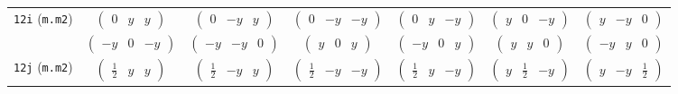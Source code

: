 \documentclass[fleqn,9pt,landscape]{jsarticle}
\begin{document}
\begin{center}
\begin{longtable}{ccccccc}
{\tt 12i} ({\tt m.m2}) & $ \begin{pmatrix} 0 & y & y \end{pmatrix} $ & $ \begin{pmatrix} 0 & - y & y \end{pmatrix} $ & $ \begin{pmatrix} 0 & - y & - y \end{pmatrix} $ & $ \begin{pmatrix} 0 & y & - y \end{pmatrix} $ & $ \begin{pmatrix} y & 0 & - y \end{pmatrix} $ & $ \begin{pmatrix} y & - y & 0 \end{pmatrix} $ \\
& $ \begin{pmatrix} - y & 0 & - y \end{pmatrix} $ & $ \begin{pmatrix} - y & - y & 0 \end{pmatrix} $ & $ \begin{pmatrix} y & 0 & y \end{pmatrix} $ & $ \begin{pmatrix} - y & 0 & y \end{pmatrix} $ & $ \begin{pmatrix} y & y & 0 \end{pmatrix} $ & $ \begin{pmatrix} - y & y & 0 \end{pmatrix} $ \\ \hline
{\tt 12j} ({\tt m.m2}) & $ \begin{pmatrix} \frac{1}{2} & y & y \end{pmatrix} $ & $ \begin{pmatrix} \frac{1}{2} & - y & y \end{pmatrix} $ & $ \begin{pmatrix} \frac{1}{2} & - y & - y \end{pmatrix} $ & $ \begin{pmatrix} \frac{1}{2} & y & - y \end{pmatrix} $ & $ \begin{pmatrix} y & \frac{1}{2} & - y \end{pmatrix} $ & $ \begin{pmatrix} y & - y & \frac{1}{2} \end{pmatrix} $ \\

\end{longtable}
\end{center}
\end{document}
